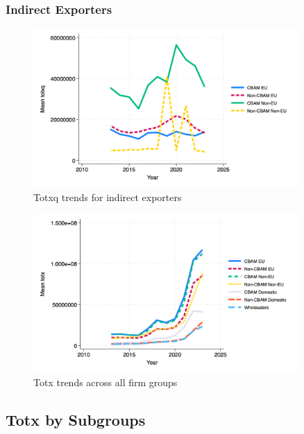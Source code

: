 \documentclass{article}
\begin{document}
\subsubsection{Indirect Exporters}
\begin{figure}[h!]
\centering
\includegraphics[width=0.9\textwidth]{totxq_indir.png}
\caption{Totxq trends for indirect exporters}
\label{fig:totxq_indir}
\end{figure}

\begin{figure}[h!]
\centering
\includegraphics[width=0.9\textwidth]{totx_main_groups.png}
\caption{Totx trends across all firm groups}
\label{fig:totx_main}
\end{figure}

\subsection{Totx by Subgroups}
\end{document}
